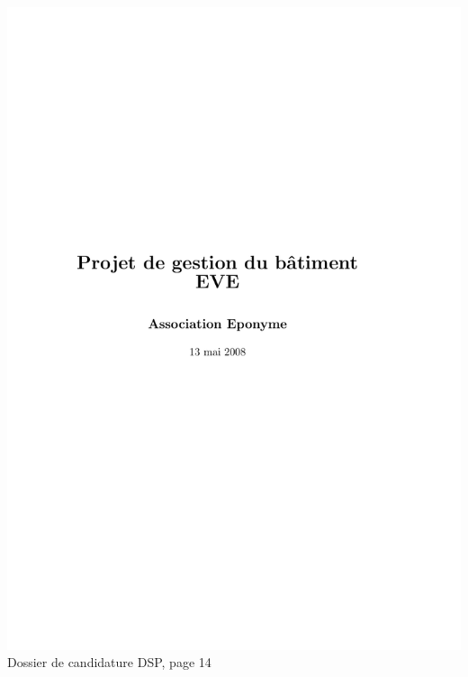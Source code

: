\includegraphics[scale=0.85,trim=20mm 20mm 20mm 20mm,clip,page=14]{annexes/candidature_dsp.pdf} \\
Dossier de candidature DSP, page 14
\newpage
